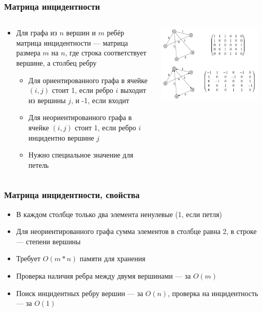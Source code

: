 \documentclass[xetex,mathserif,serif]{beamer}
\begin{document}
	\begin{frame}
		\frametitle{Матрица инцидентности}
		\begin{columns}
			\begin{column}{0.5\textwidth}
				\begin{itemize}
					\item Для графа из $n$ вершин и $m$ ребёр матрица инцидентности --- матрица размера $m$ на $n$, где строка соответствует вершине, а столбец ребру
					\begin{itemize}
						\item Для ориентированного графа в ячейке $(i, j)$ стоит 1, если ребро $i$ выходит из вершины $j$, и -1, если входит
						\item Для неориентированного графа в ячейке $(i, j)$ стоит 1, если ребро $i$ инцидентно вершине $j$
						\item Нужно специальное значение для петель
					\end{itemize}
				\end{itemize}
			\end{column}
			\begin{column}{0.5\textwidth}
				\begin{center}
					\includegraphics[width=0.95\textwidth]{incidence-matrix.png}
				\end{center}
			\end{column}
		\end{columns}
	\end{frame}

	\begin{frame}
		\frametitle{Матрица инцидентности, свойства}
		\begin{itemize}
			\item В каждом столбце только два элемента ненулевые (1, если петля)
			\item Для неориентированного графа сумма элементов в столбце равна 2, в строке --- степени вершины
			\item Требует $O(m * n)$ памяти для хранения
			\item Проверка наличия ребра между двумя вершинами --- за $O(m)$
			\item Поиск инцидентных ребру вершин --- за $O(n)$, проверка на инцидентность --- за $O(1)$
		\end{itemize}
	\end{frame}
\end{document}
